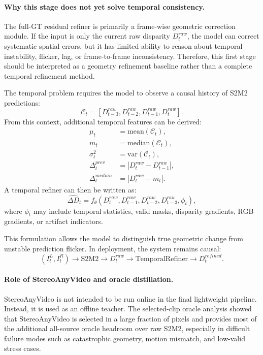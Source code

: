 \documentclass[11pt,a4paper]{article}
\begin{document}
\paragraph{Why this stage does not yet solve temporal consistency.}
The full-GT residual refiner is primarily a frame-wise geometric correction
module. If the input is only the current raw disparity \(D_t^{raw}\), the model
can correct systematic spatial errors, but it has limited ability to reason about
temporal instability, flicker, lag, or frame-to-frame inconsistency. Therefore,
this first stage should be interpreted as a geometry refinement baseline rather
than a complete temporal refinement method.

The temporal problem requires the model to observe a causal history of S2M2
predictions:
\[
\mathcal{C}_t =
\left[
D_{t-3}^{raw},
D_{t-2}^{raw},
D_{t-1}^{raw},
D_t^{raw}
\right].
\]
From this context, additional temporal features can be derived:
\[
\begin{aligned}
\mu_t &= \mathrm{mean}(\mathcal{C}_t), \\
m_t &= \mathrm{median}(\mathcal{C}_t), \\
\sigma_t^2 &= \mathrm{var}(\mathcal{C}_t), \\
\Delta_t^{prev} &= |D_t^{raw} - D_{t-1}^{raw}|, \\
\Delta_t^{median} &= |D_t^{raw} - m_t|.
\end{aligned}
\]
A temporal refiner can then be written as:
\[
\widehat{\Delta D}_t
=
f_{\theta}
\left(
D_t^{raw},
D_{t-1}^{raw},
D_{t-2}^{raw},
D_{t-3}^{raw},
\phi_t
\right),
\]
where \(\phi_t\) may include temporal statistics, valid masks, disparity
gradients, RGB gradients, or artifact indicators.

This formulation allows the model to distinguish true geometric change from
unstable prediction flicker. In deployment, the system remains causal:
\[
(I_t^L, I_t^R)
\rightarrow
\mathrm{S2M2}
\rightarrow
D_t^{raw}
\rightarrow
\mathrm{TemporalRefiner}
\rightarrow
D_t^{refined}.
\]

\paragraph{Role of StereoAnyVideo and oracle distillation.}
StereoAnyVideo is not intended to be run online in the final lightweight
pipeline. Instead, it is used as an offline teacher. The selected-clip oracle
analysis showed that StereoAnyVideo is selected in a large fraction of pixels and
provides most of the additional all-source oracle headroom over raw S2M2,
especially in difficult failure modes such as catastrophic geometry, motion
mismatch, and low-valid stress cases.
\end{document}
